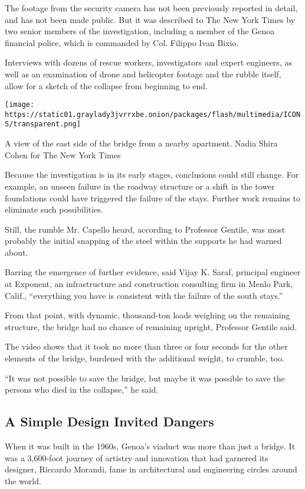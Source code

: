 The footage from the security camera has not been previously reported in
detail, and has not been made public. But it was described to The New
York Times by two senior members of the investigation, including a
member of the Genoa financial police, which is commanded by Col. Filippo
Ivan Bixio.

Interviews with dozens of rescue workers, investigators and expert
engineers, as well as an examination of drone and helicopter footage and
the rubble itself, allow for a sketch of the collapse from beginning to
end.

\texttt{[image: https://static01.graylady3jvrrxbe.onion/packages/flash/multimedia/ICONS/transparent.png]}

A view of the east side of the bridge from a nearby apartment. Nadia
Shira Cohen for The New York Times

Because the investigation is in its early stages, conclusions could
still change. For example, an unseen failure in the roadway structure or
a shift in the tower foundations could have triggered the failure of the
stays. Further work remains to eliminate such possibilities.

Still, the rumble Mr. Capello heard, according to Professor Gentile, was
most probably the initial snapping of the steel within the supports he
had warned about.

Barring the emergence of further evidence, said Vijay K. Saraf,
principal engineer at Exponent, an infrastructure and construction
consulting firm in Menlo Park, Calif., ``everything you have is
consistent with the failure of the south stays.''

From that point, with dynamic, thousand-ton loads weighing on the
remaining structure, the bridge had no chance of remaining upright,
Professor Gentile said.

The video shows that it took no more than three or four seconds for the
other elements of the bridge, burdened with the additional weight, to
crumble, too.

``It was not possible to save the bridge, but maybe it was possible to
save the persons who died in the collapse,'' he said.

\hypertarget{a-simple-design-invited-dangers}{%
\subsection{A Simple Design Invited
Dangers}\label{a-simple-design-invited-dangers}}

When it was built in the 1960s, Genoa's viaduct was more than just a
bridge. It was a 3,600-foot journey of artistry and innovation that had
garnered its designer, Riccardo Morandi, fame in architectural and
engineering circles around the world.

